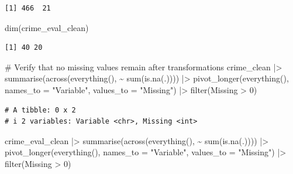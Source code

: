 \documentclass[
  11pt]{article}
\newenvironment{Shaded}{\begin{snugshade}}{\end{snugshade}}
\newcommand{\AttributeTok}[1]{\textcolor[rgb]{0.40,0.45,0.13}{#1}}
\newcommand{\CommentTok}[1]{\textcolor[rgb]{0.37,0.37,0.37}{#1}}
\newcommand{\DecValTok}[1]{\textcolor[rgb]{0.68,0.00,0.00}{#1}}
\newcommand{\FunctionTok}[1]{\textcolor[rgb]{0.28,0.35,0.67}{#1}}
\newcommand{\NormalTok}[1]{\textcolor[rgb]{0.00,0.23,0.31}{#1}}
\newcommand{\SpecialCharTok}[1]{\textcolor[rgb]{0.37,0.37,0.37}{#1}}
\newcommand{\StringTok}[1]{\textcolor[rgb]{0.13,0.47,0.30}{#1}}
\begin{document}
\begin{verbatim}
[1] 466  21
\end{verbatim}

\begin{Shaded}
\begin{Highlighting}[]
\FunctionTok{dim}\NormalTok{(crime\_eval\_clean)}
\end{Highlighting}
\end{Shaded}

\begin{verbatim}
[1] 40 20
\end{verbatim}

\begin{Shaded}
\begin{Highlighting}[]
\CommentTok{\# Verify that no missing values remain after transformations}
\NormalTok{crime\_clean }\SpecialCharTok{|\textgreater{}}
  \FunctionTok{summarise}\NormalTok{(}\FunctionTok{across}\NormalTok{(}\FunctionTok{everything}\NormalTok{(), }\SpecialCharTok{\textasciitilde{}} \FunctionTok{sum}\NormalTok{(}\FunctionTok{is.na}\NormalTok{(.)))) }\SpecialCharTok{|\textgreater{}}
  \FunctionTok{pivot\_longer}\NormalTok{(}\FunctionTok{everything}\NormalTok{(), }\AttributeTok{names\_to =} \StringTok{"Variable"}\NormalTok{, }\AttributeTok{values\_to =} \StringTok{"Missing"}\NormalTok{) }\SpecialCharTok{|\textgreater{}}
  \FunctionTok{filter}\NormalTok{(Missing }\SpecialCharTok{\textgreater{}} \DecValTok{0}\NormalTok{)}
\end{Highlighting}
\end{Shaded}

\begin{verbatim}
# A tibble: 0 x 2
# i 2 variables: Variable <chr>, Missing <int>
\end{verbatim}

\begin{Shaded}
\begin{Highlighting}[]
\NormalTok{crime\_eval\_clean }\SpecialCharTok{|\textgreater{}}
  \FunctionTok{summarise}\NormalTok{(}\FunctionTok{across}\NormalTok{(}\FunctionTok{everything}\NormalTok{(), }\SpecialCharTok{\textasciitilde{}} \FunctionTok{sum}\NormalTok{(}\FunctionTok{is.na}\NormalTok{(.)))) }\SpecialCharTok{|\textgreater{}}
  \FunctionTok{pivot\_longer}\NormalTok{(}\FunctionTok{everything}\NormalTok{(), }\AttributeTok{names\_to =} \StringTok{"Variable"}\NormalTok{, }\AttributeTok{values\_to =} \StringTok{"Missing"}\NormalTok{) }\SpecialCharTok{|\textgreater{}}
  \FunctionTok{filter}\NormalTok{(Missing }\SpecialCharTok{\textgreater{}} \DecValTok{0}\NormalTok{)}
\end{Highlighting}
\end{Shaded}
\end{document}

